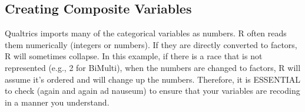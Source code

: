 \documentclass[
  11pt,
]{book}
\begin{document}
\hypertarget{creating-composite-variables}{%
\subsection{Creating Composite Variables}\label{creating-composite-variables}}

Qualtrics imports many of the categorical variables as numbers. R often reads them numerically (integers or numbers). If they are directly converted to factors, R will sometimes collapse. In this example, if there is a race that is not represented (e.g., 2 for BiMulti), when the numbers are changed to factors, R will assume it's ordered and will change up the numbers. Therefore, it is ESSENTIAL to check (again and again ad nauseum) to ensure that your variables are recoding in a manner you understand.
\end{document}
